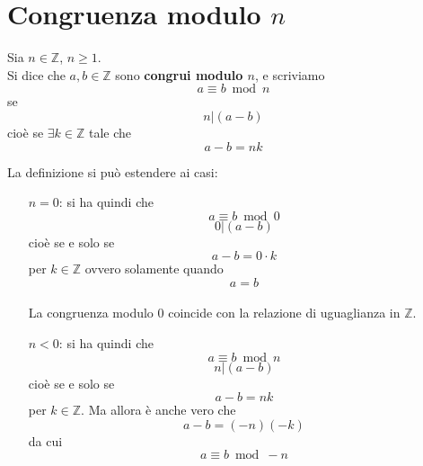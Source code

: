 \documentclass[a4paper,12pt, oneside]{book}
\begin{document}
\section{Congruenza modulo $n$}
\begin{definizione}
	Sia $n \in \mathbb{Z}$, $n \geq 1$.\\
	Si dice che $a,b \in \mathbb{Z}$ sono \textbf{congrui modulo $n$}, e scriviamo $$a \equiv b \bmod n$$
	se
	$$n | (a-b)$$
	cioè se $\exists k \in \mathbb{Z}$ tale che
	$$a-b=nk$$
\end{definizione}
\begin{osservazione}
	La definizione si può estendere ai casi: \begin{enumerate}
		\item [$n = 0$: ] si ha quindi che
		      $$a \equiv b \bmod 0$$
		      $$0|(a-b)$$
		      cioè se e solo se $$a-b = 0 \cdot k$$ per $k \in \mathbb{Z}$
		      ovvero solamente quando $$a=b$$\\
		      La congruenza modulo $0$ coincide con la relazione di uguaglianza in $\mathbb{Z}$.
		\item [$n < 0$: ] si ha quindi che
		      $$a \equiv b \bmod n$$
		      $$n | (a-b)$$
		      cioè se e solo se $$a-b=nk$$ per $k \in \mathbb{Z}$.
		      Ma allora è anche vero che $$a-b = (-n)(-k)$$
		      da cui $$a \equiv b \bmod -n$$
	\end{enumerate}
\end{osservazione}
\end{document}
